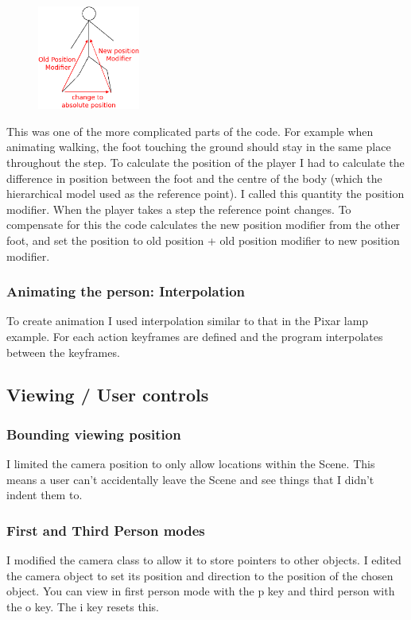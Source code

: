 \documentclass[12pt]{article}
\begin{document}
\begin{figure}
\centering
\includegraphics[width=0.3\textwidth]{posmod.png}
\end{figure}
This was one of the more complicated parts of the code. For example when animating walking, the foot touching the ground should stay in the same place throughout the step. To calculate the position of the player I had to calculate the difference in position between the foot and the centre of the body (which the hierarchical model used as the reference point). I called this quantity the position modifier. When the player takes a step the reference point changes. To compensate for this the code calculates the new position modifier from the other foot, and set the position to old position + old position modifier to new position modifier. 
\subsubsection{Animating the person: Interpolation}
To create animation I used interpolation similar to that in the Pixar lamp example. For each action keyframes are defined and the program interpolates between the keyframes. 

\subsection{Viewing / User controls}

\subsubsection{Bounding viewing position}
I limited the camera position to only allow locations within the Scene. This means a user can't accidentally leave the Scene and see things that I didn't indent them to.

\subsubsection{First and Third Person modes}

I modified the camera class to allow it to store pointers to other objects. I edited the camera object to set its position and direction to the position of the chosen object. You can view in first person mode with the p key and third person with the o key. The i key resets this.
\end{document}
